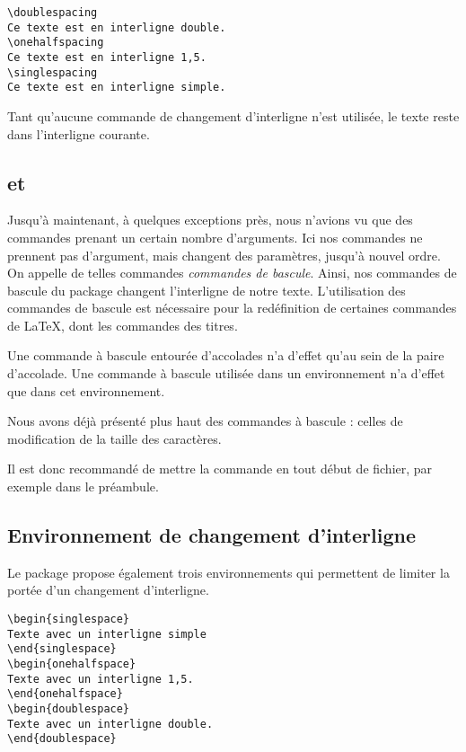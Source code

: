 \begin{verbatim}
\doublespacing
Ce texte est en interligne double.
\onehalfspacing
Ce texte est en interligne 1,5.
\singlespacing
Ce texte est en interligne simple. 
\end{verbatim}

Tant qu'aucune commande de changement d'interligne n'est utilisée, le texte reste dans l'interligne courante. 

\subsection{ et }\label{bascule}

Jusqu'à maintenant, à quelques exceptions près, nous n'avions vu que des commandes prenant un certain nombre d'arguments. Ici nos commandes ne prennent pas d'argument, mais changent des paramètres, jusqu'à nouvel ordre. On appelle de telles commandes \emph{commandes de bascule}. Ainsi, nos commandes de bascule du package  changent l'interligne de notre texte. L'utilisation des commandes de bascule est nécessaire pour la redéfinition de certaines commandes de \LaTeX, dont les commandes des titres.

Une commande à bascule entourée d'accolades n'a d'effet qu'au sein de la paire d'accolade. Une commande à bascule utilisée dans un environnement n'a d'effet que dans cet environnement.\label{porteebascule} 

Nous avons déjà présenté plus haut des commandes à bascule : celles de modification de la taille des caractères.

Il est donc recommandé de mettre la commande  en tout début de fichier, par exemple dans le préambule.

\subsection{Environnement de changement d'interligne}

Le package  propose également trois environnements qui permettent de limiter la portée d'un changement d'interligne. 

\begin{verbatim}
\begin{singlespace}
Texte avec un interligne simple
\end{singlespace}
\begin{onehalfspace}
Texte avec un interligne 1,5.
\end{onehalfspace}
\begin{doublespace}
Texte avec un interligne double.
\end{doublespace}
\end{verbatim}

